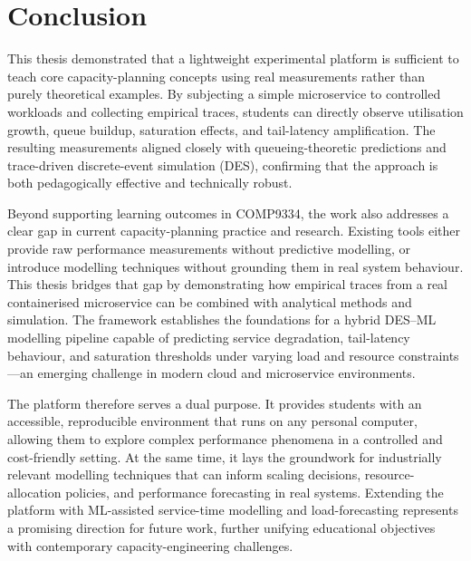 \chapter{Conclusion}\label{ch:conclusion}

This thesis demonstrated that a lightweight experimental platform is sufficient to teach core capacity-planning concepts using real measurements rather than purely theoretical examples. By subjecting a simple microservice to controlled workloads and collecting empirical traces, students can directly observe utilisation growth, queue buildup, saturation effects, and tail-latency amplification. The resulting measurements aligned closely with queueing-theoretic predictions and trace-driven discrete-event simulation (DES), confirming that the approach is both pedagogically effective and technically robust.

Beyond supporting learning outcomes in COMP9334, the work also addresses a clear gap in current capacity-planning practice and research. Existing tools either provide raw performance measurements without predictive modelling, or introduce modelling techniques without grounding them in real system behaviour. This thesis bridges that gap by demonstrating how empirical traces from a real containerised microservice can be combined with analytical methods and simulation. The framework establishes the foundations for a hybrid DES–ML modelling pipeline capable of predicting service degradation, tail-latency behaviour, and saturation thresholds under varying load and resource constraints—an emerging challenge in modern cloud and microservice environments.

The platform therefore serves a dual purpose. It provides students with an accessible, reproducible environment that runs on any personal computer, allowing them to explore complex performance phenomena in a controlled and cost-friendly setting. At the same time, it lays the groundwork for industrially relevant modelling techniques that can inform scaling decisions, resource-allocation policies, and performance forecasting in real systems. Extending the platform with ML-assisted service-time modelling and load-forecasting represents a promising direction for future work, further unifying educational objectives with contemporary capacity-engineering challenges.
